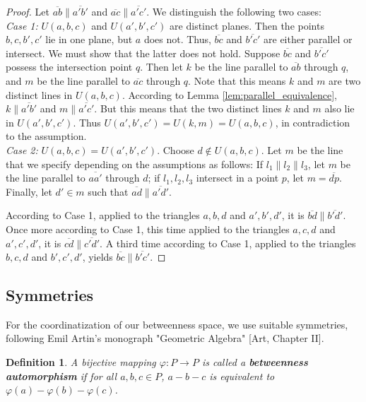 \documentclass[11pt,a4paper]{article}
\newcommand{\betw}[3]{#1 - #2 - #3}
\newcommand{\lineab}[1]{\overline{#1}}
\newtheorem{definition}[theorem]{Definition}
\begin{document}
\begin{proof}
Let $\lineab{ab} \parallel \lineab{a'b'}$ and $\lineab{ac} \parallel \lineab{a'c'}$. We distinguish the following two cases: \\
\textit{Case 1:} $U(a, b, c)$ and $U(a', b', c')$ are distinct planes. Then the points $b, c, b', c'$ lie in one plane, but $a$ does not. Thus, $\lineab{bc}$ and $\lineab{b'c'}$ are either parallel or intersect. We must show that the latter does not hold. Suppose $\lineab{bc}$ and $\lineab{b'c'}$ possess the intersection point $q$. Then let $k$ be the line parallel to $\lineab{ab}$ through $q$, and $m$ be the line parallel to $\lineab{ac}$ through $q$. Note that this means $k$ and $m$ are two distinct lines in $U(a, b, c)$. According to Lemma \ref{lem:parallel_equivalence}, $k \parallel \lineab{a'b'}$ and $m \parallel \lineab{a'c'}$. But this means that the two distinct lines $k$ and $m$ also lie in $U(a', b', c')$. Thus $U(a', b', c') = U(k, m) = U(a, b, c)$, in contradiction to the assumption. \\
\textit{Case 2:} $U(a, b, c) = U(a', b', c')$. Choose $d \notin U(a, b, c)$. Let $m$ be the line that we specify depending on the assumptions as follows: If $l_1 \parallel l_2 \parallel l_3$, let $m$ be the line parallel to $\lineab{aa'}$ through $d$; if $l_1, l_2, l_3$ intersect in a point $p$, let $m = \lineab{dp}$. Finally, let $d' \in m$ such that $\lineab{ad} \parallel \lineab{a'd'}$.

According to Case 1, applied to the triangles $a, b, d$ and $a', b', d'$, it is $\lineab{bd} \parallel \lineab{b'd'}$. Once more according to Case 1, this time applied to the triangles $a, c, d$ and $a', c', d'$, it is $\lineab{cd} \parallel \lineab{c'd'}$. A third time according to Case 1, applied to the triangles $b, c, d$ and $b', c', d'$, yields $\lineab{bc} \parallel \lineab{b'c'}$.
\end{proof}

\subsection{Symmetries}

For the coordinatization of our betweenness space, we use suitable symmetries, following Emil Artin's monograph "Geometric Algebra" [Art, Chapter II].

\begin{definition} \label{def:automorphism}
A bijective mapping $\varphi: P \to P$ is called a \textbf{betweenness automorphism} if for all $a, b, c \in P$, $\betw{a}{b}{c}$ is equivalent to $\betw{\varphi(a)}{\varphi(b)}{\varphi(c)}$.
\end{definition}
\end{document}
